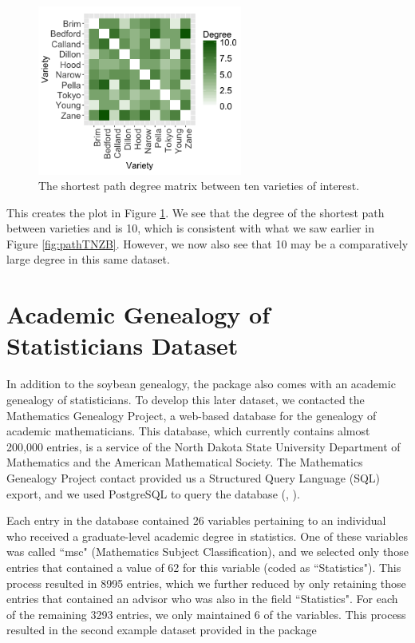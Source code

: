 \documentclass[article,shortnames]{jss}
\begin{document}
\begin{figure}[h]
    \centering
    \includegraphics[width=0.6\textwidth]{degMatrix}
    \caption{The shortest path degree matrix between ten varieties of interest.}
    \label{fig:degMatrix}
\end{figure}

This creates the plot in Figure \ref{fig:degMatrix}. We see that the degree of the shortest path between varieties  and  is 10, which is consistent with what we saw earlier in Figure \ref{fig:pathTNZB}. However, we now also see that 10 may be a comparatively large degree in this same dataset.

\section{Academic Genealogy of Statisticians Dataset}

In addition to the soybean genealogy, the  package also comes with an academic genealogy of statisticians. To develop this later dataset, we contacted the Mathematics Genealogy Project, a web-based database for the genealogy of academic mathematicians. This database, which currently contains almost 200,000 entries, is a service of the North Dakota State University Department of Mathematics and the American Mathematical Society. The Mathematics Genealogy Project contact provided us a Structured Query Language (SQL) export, and we used PostgreSQL to query the database (\citealt{psql}, \citealt{sql}).

Each entry in the database contained 26 variables pertaining to an individual who received a graduate-level academic degree in statistics. One of these variables was called ``msc" (Mathematics Subject Classification), and we selected only those entries that contained a value of 62 for this variable (coded as ``Statistics"). This process resulted in 8995 entries, which we further reduced by only retaining those entries that contained an advisor who was also in the field ``Statistics". For each of the remaining 3293 entries, we only maintained 6 of the variables. This process resulted in the second example dataset provided in the  package
\end{document}
